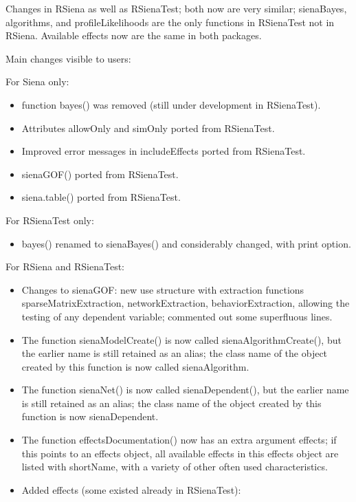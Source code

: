 \documentclass[a4paper,fleqn,11pt]{article}
\newcommand{\+}{\, + \,}
\newcommand{\sfn}[1]{\textsf{#1}}
\begin{document}
{\begin{small}
\begin{itemize}
  Changes in RSiena as well as RSienaTest;
  both now are very similar; \sfn{sienaBayes}, \sfn{algorithms}, and
  \sfn{profileLikelihoods}
  are the only functions in RSienaTest not in RSiena.
  Available effects now are the same in both packages.

  Main changes visible to users:

For Siena only:
  \begin{itemize}
	\item function \sfn{bayes()} was removed (still under development in
        RSienaTest).
	\item Attributes \sfn{allowOnly} and \sfn{simOnly} ported from
        RSienaTest.
	\item Improved error messages in  \sfn{includeEffects} ported from
        RSienaTest.
	\item \sfn{sienaGOF()} ported from RSienaTest.
	\item \sfn{siena.table()} ported from RSienaTest.
  \end{itemize}

For RSienaTest only:
  \begin{itemize}
	\item \sfn{bayes()} renamed to \sfn{sienaBayes()} and considerably changed,
         with print option.
  \end{itemize}

For RSiena and RSienaTest:
  \begin{itemize}
	\item Changes to \sfn{sienaGOF}: new use structure with extraction functions
		\sfn{sparseMatrixExtraction}, \sfn{networkExtraction},
        \sfn{behaviorExtraction},
		allowing the testing of any dependent variable;
		commented out some superfluous lines.
	\item The function \sfn{sienaModelCreate()} is now called
        \sfn{sienaAlgorithmCreate()},
		but the earlier name is still retained as an alias;
		the class name of the object created by this function is now called
		\sfn{sienaAlgorithm}.
	\item The function \sfn{sienaNet()} is now called \sfn{sienaDependent()},
		but the earlier name is still retained as an alias;
		the class name of the object created by this function is now
		\sfn{sienaDependent}.
	\item The function \sfn{effectsDocumentation()} now has an extra argument
        \sfn{effects};
		if this points to an effects object, all available effects
		in this effects object are listed with \sfn{shortName},
		with a variety of other often used characteristics.
	\item Added effects (some existed already in \sfn{RSienaTest}):


\end{itemize}
\end{itemize}
\end{small}}
\end{document}
